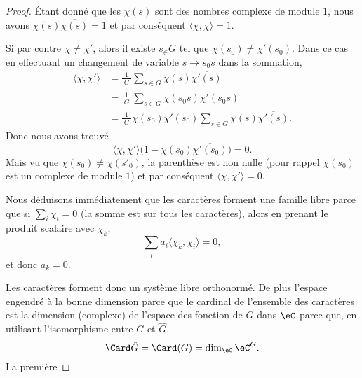 \begin{proof}
    Étant donné que les \( \chi(s)\) sont des nombres complexe de module \( 1\), nous avons \( \chi(s)\overline{ \chi(s) }=1\) et par conséquent \( \langle \chi, \chi\rangle =1\).

    Si par contre \( \chi\neq\chi'\), alors il existe \( s_\in G\) tel que \( \chi(s_0)\neq \chi'(s_0)\). Dans ce cas en effectuant un changement de variable \( s\to s_0s\) dans la sommation,
    \begin{subequations}
        \begin{align}
            \langle \chi, \chi'\rangle &=\frac{1}{ | G | }\sum_{s\in G}\chi(s)\overline{ \chi'(s) }\\
            &=\frac{1}{ | G | }\sum_{s\in G}\chi(s_0s)\overline{ \chi'(s_0s) }\\
            &=\frac{1}{ | G | }\chi(s_0)\chi'(s_0)\sum_{s\in G}\chi(s)\overline{ \chi'(s) }.
        \end{align}
    \end{subequations}
    Donc nous avons trouvé
    \begin{equation}
        \langle \chi, \chi'\rangle \big( 1-\chi(s_0)\overline{ \chi'(s_0) } \big)=0.
    \end{equation}
    Mais vu que \( \chi(s_0)\neq \chi(s'_0)\), la parenthèse est non nulle (pour rappel \( \chi(s_0)\) est un complexe de module \( 1\)) et par conséquent \( \langle \chi, \chi'\rangle =0\).

    Nous déduisons immédiatement que les caractères forment une famille libre parce que si \( \sum_i\chi_i=0\) (la somme est sur tous les caractères), alors en prenant le produit scalaire avec \( \chi_k\),
    \begin{equation}
        \sum_ia_i\langle \chi_k, \chi_i\rangle =0,
    \end{equation}
    et donc \( a_k=0\).

    Les caractères forment donc un système libre orthonormé. De plus l'espace engendré à la bonne dimension parce que le cardinal de l'ensemble des caractères est la dimension (complexe) de l'espace des fonction de \( G\) dans \( \eC\) parce que, en utilisant l'isomorphisme entre \( G\) et \( \hat G\),
    \begin{equation}
        \Card\hat G=\Card(G)=\dim_{\eC}\eC^G.
    \end{equation}
    La première 
\end{proof}

